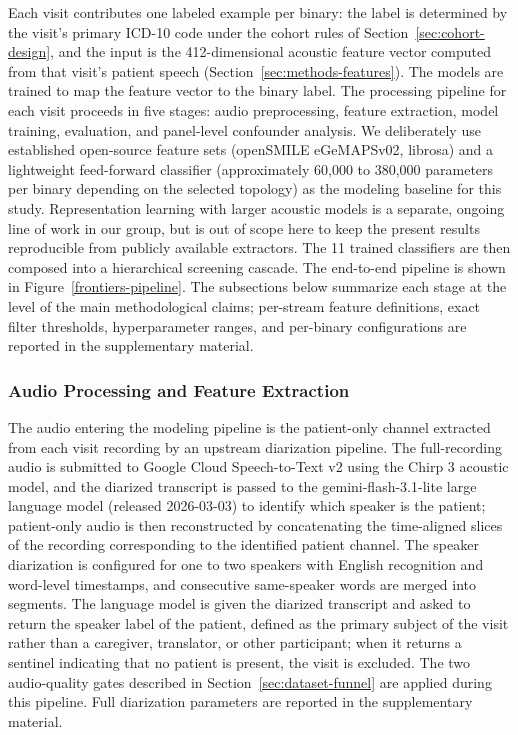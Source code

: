 \documentclass[utf8]{FrontiersinHarvard} %
\begin{document}
Each visit contributes one labeled example per binary: the label is determined by the visit's primary ICD-10 code under the cohort rules of Section~\ref{sec:cohort-design}, and the input is the 412-dimensional acoustic feature vector computed from that visit's patient speech (Section~\ref{sec:methods-features}). The models are trained to map the feature vector to the binary label. The processing pipeline for each visit proceeds in five stages: audio preprocessing, feature extraction, model training, evaluation, and panel-level confounder analysis. We deliberately use established open-source feature sets (openSMILE eGeMAPSv02, librosa) and a lightweight feed-forward classifier (approximately 60{,}000 to 380{,}000 parameters per binary depending on the selected topology) as the modeling baseline for this study. Representation learning with larger acoustic models is a separate, ongoing line of work in our group, but is out of scope here to keep the present results reproducible from publicly available extractors. The 11 trained classifiers are then composed into a hierarchical screening cascade. The end-to-end pipeline is shown in Figure~\ref{frontiers-pipeline}. The subsections below summarize each stage at the level of the main methodological claims; per-stream feature definitions, exact filter thresholds, hyperparameter ranges, and per-binary configurations are reported in the supplementary material.

\subsubsection{Audio Processing and Feature Extraction}
\label{sec:methods-audio}
\label{sec:methods-diarization}
\label{sec:methods-features}

The audio entering the modeling pipeline is the patient-only channel extracted from each visit recording by an upstream diarization pipeline. The full-recording audio is submitted to Google Cloud Speech-to-Text v2 using the Chirp 3 acoustic model, and the diarized transcript is passed to the gemini-flash-3.1-lite large language model (released 2026-03-03) to identify which speaker is the patient; patient-only audio is then reconstructed by concatenating the time-aligned slices of the recording corresponding to the identified patient channel. The speaker diarization is configured for one to two speakers with English recognition and word-level timestamps, and consecutive same-speaker words are merged into segments. The language model is given the diarized transcript and asked to return the speaker label of the patient, defined as the primary subject of the visit rather than a caregiver, translator, or other participant; when it returns a sentinel indicating that no patient is present, the visit is excluded. The two audio-quality gates described in Section~\ref{sec:dataset-funnel} are applied during this pipeline. Full diarization parameters are reported in the supplementary material.
\end{document}
